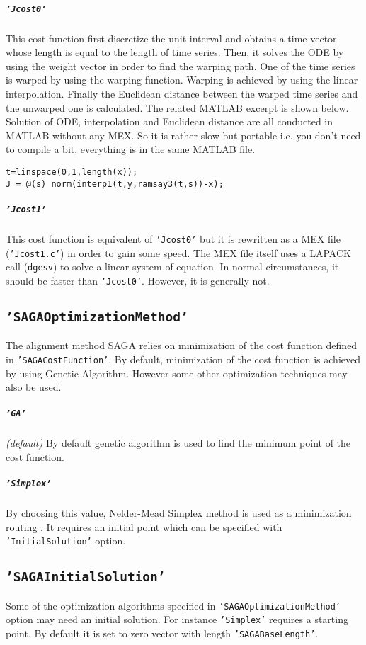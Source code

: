 \documentclass{article}
\begin{document}
\subparagraph*{\texttt{'Jcost0'}} This cost function first discretize the unit interval and obtains a time vector whose length is equal to the length of time series. Then,  it solves the ODE by using the weight vector in order to find the warping path. One of the time series is warped by using the warping function. Warping is achieved by using the linear interpolation. Finally the Euclidean distance between the warped time series and the unwarped one is calculated. The related MATLAB excerpt is shown below. Solution of ODE, interpolation and Euclidean distance are all conducted in MATLAB without any MEX. So it is rather slow but portable i.e. you don't need to compile a bit, everything is in the same MATLAB file. 
\begin{verbatim}
t=linspace(0,1,length(x));
J = @(s) norm(interp1(t,y,ramsay3(t,s))-x);
\end{verbatim}

\subparagraph*{\texttt{'Jcost1'}} This cost function is equivalent of \texttt{'Jcost0'} but it is rewritten as a MEX file (\texttt{'Jcost1.c'}) in order to gain some speed. The MEX file itself uses a LAPACK call (\texttt{dgesv}) to solve a linear system of equation. In normal circumstances, it should be faster than \texttt{'Jcost0'}. However, it is generally not.

\subsection*{\texttt{'SAGAOptimizationMethod'}}
The alignment method SAGA relies on minimization of the cost function defined in \texttt{'SAGACostFunction'}. By default, minimization of the cost function is achieved by using Genetic Algorithm. However some other optimization techniques may also be used.

\subparagraph*{\texttt{'GA'}} {\it (default)} By default genetic algorithm is used to find the minimum point of the cost function.

\subparagraph*{\texttt{'Simplex'}} By choosing this value, Nelder-Mead Simplex method is used as a minimization routing \cite{Lagarias1998}. It requires an initial point which can be specified with \texttt{'InitialSolution'} option.

\subsection{\texttt{'SAGAInitialSolution'}}
Some of the optimization algorithms specified in \texttt{'SAGAOptimizationMethod'} option may need an initial solution. For instance \texttt{'Simplex'} requires a starting point. By default it is set to zero vector with length \texttt{'SAGABaseLength'}.
\end{document}
